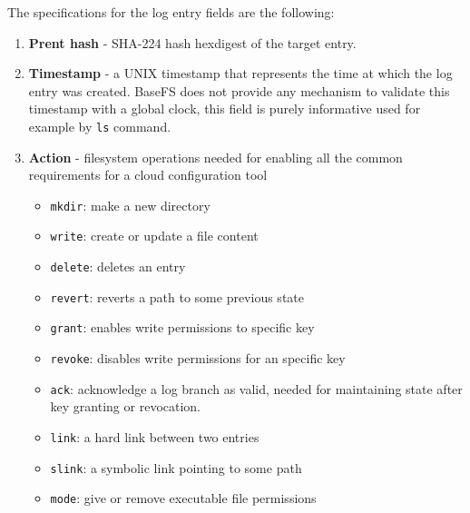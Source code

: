 \documentclass{sig-alternate}
\begin{document}
The specifications for the log entry fields are the following:

\begin{enumerate}
\item \textbf{Prent hash} - SHA-224 hash hexdigest of the target entry. 
\item \textbf{Timestamp} - a UNIX timestamp that represents the time at which the log entry was created. BaseFS does not provide any mechanism to validate this timestamp with a global clock, this field is purely informative used for example by \texttt{ls} command.
\item \textbf{Action} - filesystem operations needed for enabling all the common requirements for a cloud configuration tool
    \begin{itemize}
    \item \texttt{mkdir}: make a new directory
    \item \texttt{write}: create or update a file content
    \item \texttt{delete}: deletes an entry
    \item \texttt{revert}: reverts a path to some previous state
    \item \texttt{grant}: enables write permissions to specific key
    \item \texttt{revoke}: disables write permissions for an specific key
    \item \texttt{ack}: acknowledge a log branch as valid, needed for maintaining state after key granting or revocation.
    \item \texttt{link}: a hard link between two entries
    \item \texttt{slink}: a symbolic link pointing to some path
    \item \texttt{mode}: give or remove executable file permissions
    \end{itemize}


\end{enumerate}
\end{document}
